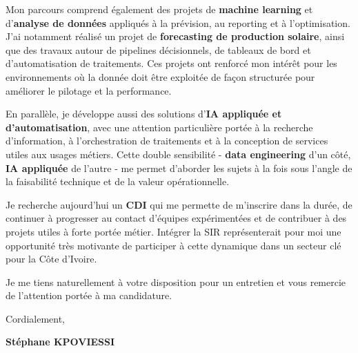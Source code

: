 \documentclass[letterpaper,11pt]{article}
\begin{document}
Mon parcours comprend également des projets de \textbf{machine learning} et d'\textbf{analyse de données} appliqués à la prévision, au reporting et à l'optimisation. J'ai notamment réalisé un projet de \textbf{forecasting de production solaire}, ainsi que des travaux autour de pipelines décisionnels, de tableaux de bord et d'automatisation de traitements. Ces projets ont renforcé mon intérêt pour les environnements où la donnée doit être exploitée de façon structurée pour améliorer le pilotage et la performance.

En parallèle, je développe aussi des solutions d'\textbf{IA appliquée et d'automatisation}, avec une attention particulière portée à la recherche d'information, à l'orchestration de traitements et à la conception de services utiles aux usages métiers. Cette double sensibilité - \textbf{data engineering} d'un côté, \textbf{IA appliquée} de l'autre - me permet d'aborder les sujets à la fois sous l'angle de la faisabilité technique et de la valeur opérationnelle.

Je recherche aujourd'hui un \textbf{CDI} qui me permette de m'inscrire dans la durée, de continuer à progresser au contact d'équipes expérimentées et de contribuer à des projets utiles à forte portée métier. Intégrer la SIR représenterait pour moi une opportunité très motivante de participer à cette dynamique dans un secteur clé pour la Côte d'Ivoire.

Je me tiens naturellement à votre disposition pour un entretien et vous remercie de l'attention portée à ma candidature.

\vspace{0.4cm}

Cordialement,

\vspace{0.6cm}

{\color{primary}\textbf{Stéphane KPOVIESSI}}
\end{document}
